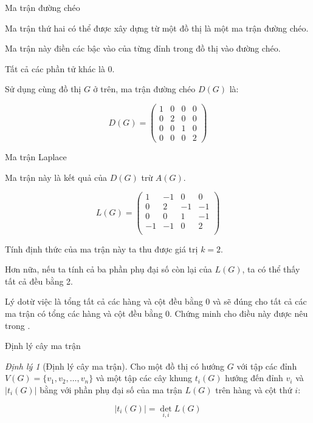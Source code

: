 \documentclass[10pt]{beamer}
\theoremstyle{remark}
\newtheorem{dl}{Định lý}
\numberwithin{algocf}{section}
\numberwithin{equation}{section}
\numberwithin{dl}{section}
\numberwithin{figure}{section}
\begin{document}
\begin{frame}{Ma trận đường chéo}

    Ma trận thứ hai có thể được xây dựng từ một đồ thị là một ma trận đường chéo.

    Ma trận này điền các bậc vào của từng đỉnh trong đồ thị vào đường chéo.

    Tất cả các phần tử khác là 0.

    Sử dụng cùng đồ thị $G$ ở trên, ma trận đường chéo $D(G)$ là:

    \begin{equation*}
        D(G) = \begin{pmatrix}
            1 & 0 & 0 & 0 \\
            0 & 2 & 0 & 0 \\
            0 & 0 & 1 & 0 \\
            0 & 0 & 0 & 2
        \end{pmatrix}
    \end{equation*} 
    
\end{frame}

\begin{frame}{Ma trận Laplace}

    Ma trận này là kết quả của $D(G)$ trừ $A(G)$.

    \begin{equation*}
        L(G) = \begin{pmatrix}
            1 & -1 & 0 & 0 \\
            0 & 2 & -1 & -1 \\
            0 & 0 & 1 & -1 \\
            -1 & -1 & 0 & 2 \\
        \end{pmatrix}
    \end{equation*}

    Tính định thức của ma trận này ta thu được giá trị $k=2$.

    Hơn nữa, nếu ta tính cả ba phần phụ đại số còn lại của $L(G)$, ta có thể thấy tất cả đều bằng 2.

    Lý dotừ việc là tổng tất cả các hàng và cột đều bằng 0 và sẽ đúng cho tất cả các ma trận có tổng các hàng và cột đều bằng 0.
    Chứng minh cho điều này được nêu trong \cite{fleischner1990eulerian}.
\end{frame}

\begin{frame}{Định lý cây ma trận}
    \begin{dl}[Định lý cây ma trận]
        Cho một đồ thị có hướng $G$ với tập các đỉnh $V(G)=\lbrace v_1, v_2, \dots, v_n \rbrace$ và một tập các cây khung $t_i (G)$ hướng đến đỉnh $v_i$ và $\lvert t_i(G) \rvert$ bằng với phần phụ đại số của ma trận $L(G)$ trên hàng và cột thứ $i$:

        \begin{equation*}
            \lvert t_i(G) \rvert = \det_{i, i} L(G)
        \end{equation*}
    \end{dl}
\end{frame}
\end{document}
